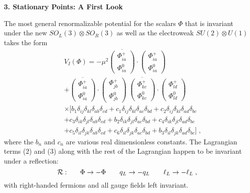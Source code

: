 \begin{center}
{\bf 3. Stationary Points: A First Look}
\end{center}


The most general renormalizable potential for the scalars $\Phi$ that is invariant under  the new $SO_L(3)\otimes  SO_R(3)$ as well as the electroweak $SU(2)\otimes U(1)$ takes the form
\begin{eqnarray}
&&V_I(\Phi)=-\mu^2\overline{\left(\begin{array}{c}\Phi^+_{ia}\\ \Phi^0_{ia}\end{array}\right)}\cdot \left(\begin{array}{c}\Phi^+_{ia}\\ \Phi^0_{ia}\end{array}\right)\nonumber\\&&
+
\overline{\left(\begin{array}{c}\Phi^+_{ia}\\ \Phi^0_{ia}\end{array}\right)}\cdot \left(\begin{array}{c}\Phi^+_{jb}\\ \Phi^0_{jb}\end{array}\right)\;
\overline{\left(\begin{array}{c}\Phi^+_{kc}\\ \Phi^0_{kc}\end{array}\right)}\cdot \left(\begin{array}{c}\Phi^+_{ld}\\ \Phi^0_{ld}\end{array}\right)\nonumber\\&& \times\Bigg[	
b_1\delta_{ij}\delta_{kl}\delta_{ab}\delta_{cd}+c_1\delta_{ij}\delta_{kl}\delta_{ac}\delta_{bd}+c_2\delta_{ij}\delta_{kl}\delta_{ad}\delta_{bc}\nonumber\\&&+c_3\delta_{ik}\delta_{jl}\delta_{ab}\delta_{cd}+b_2\delta_{ik}\delta_{jl}\delta_{ac}\delta_{bd}+c_4\delta_{ik}\delta_{jl}\delta_{ad}\delta_{bc}\nonumber\\&&+c_5\delta_{il}\delta_{jk}\delta_{ab}\delta_{cd}+c_6\delta_{il}\delta_{jk}\delta_{ac}\delta_{bd}+b_3\delta_{il}\delta_{jk}\delta_{ad}\delta_{bc}\Bigg]\;,
\end{eqnarray}
where the $b_n$ and $c_n$ are various real dimensionless constants.
The Lagrangian terms (2) and (3) along with the rest of the Lagrangian happen to be invariant under a reflection:
\begin{equation}
{\cal R}:~~~~~\Phi\rightarrow -\Phi~~~~~~q_L\rightarrow -q_L~~~~~~\ell_L\rightarrow -\ell_L\;,
\end{equation}
with right-handed fermions and all gauge fields left invariant.  


